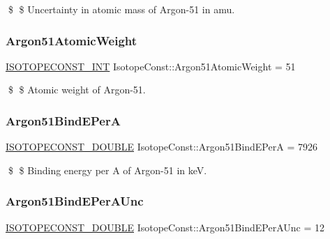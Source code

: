 \$ \$ Uncertainty in atomic mass of Argon-\/51 in amu. \mbox{\label{group___isotope_const-_argon-_ar51_ga8c404ac237a34c91840670054762fbaf}} 
\subsubsection{\texorpdfstring{Argon51\+Atomic\+Weight}{Argon51AtomicWeight}}
{\footnotesize\ttfamily \mbox{\hyperlink{group___isotope_const-_macros_ga5f18360b3e99483a35c32d789e62621c}{I\+S\+O\+T\+O\+P\+E\+C\+O\+N\+S\+T\+\_\+\+I\+NT}} Isotope\+Const\+::\+Argon51\+Atomic\+Weight = 51}

\$ \$ Atomic weight of Argon-\/51. \mbox{\label{group___isotope_const-_argon-_ar51_ga1cfcf14bf3c747ed4a8f6cec9e97db94}} 
\subsubsection{\texorpdfstring{Argon51\+Bind\+E\+PerA}{Argon51BindEPerA}}
{\footnotesize\ttfamily \mbox{\hyperlink{group___isotope_const-_macros_ga8f45a7272ce02c0b4c65c44636ed719a}{I\+S\+O\+T\+O\+P\+E\+C\+O\+N\+S\+T\+\_\+\+D\+O\+U\+B\+LE}} Isotope\+Const\+::\+Argon51\+Bind\+E\+PerA = 7926}

\$ \$ Binding energy per A of Argon-\/51 in keV. \mbox{\label{group___isotope_const-_argon-_ar51_ga568d0274550fb29941f0b5d175391879}} 
\subsubsection{\texorpdfstring{Argon51\+Bind\+E\+Per\+A\+Unc}{Argon51BindEPerAUnc}}
{\footnotesize\ttfamily \mbox{\hyperlink{group___isotope_const-_macros_ga8f45a7272ce02c0b4c65c44636ed719a}{I\+S\+O\+T\+O\+P\+E\+C\+O\+N\+S\+T\+\_\+\+D\+O\+U\+B\+LE}} Isotope\+Const\+::\+Argon51\+Bind\+E\+Per\+A\+Unc = 12}

